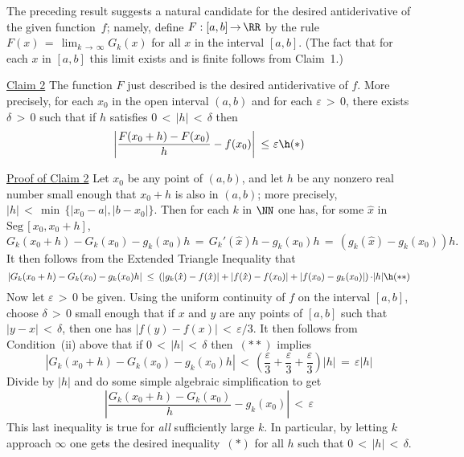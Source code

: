         The preceding result suggests a natural candidate for the desired antiderivative of the given function~$f$; namely,
    define $F:[a,b] \,{\rightarrow}\, {\RR}$ by the rule $F(x) \,=\, \lim_{k \,{\rightarrow}\, {\infty}} G_{k}(x)$ for all $x$ in the interval $[a,b]$.
    (The fact that for each $x$ in $[a,b]$ this limit exists and is finite follows from Claim~1.)

\V

    \underline{Claim 2} The function $F$ just described is the desired antiderivative of $f$.
    More precisely, for each $x_{0}$ in the open interval $(a,b)$ and for each ${\varepsilon}\,>\,0$,
    there exists ${\delta}\,>\,0$ such that if $h$ satisfies $0\,<\,|h|\,<\,{\delta}$ then
        \begin{displaymath}
        \left|\frac{F(x_{0} + h) - F(x_{0})}{h} - f(x_{0})\right|\,\,{\leq}\,\,{\varepsilon} \h ({\ast})
        \end{displaymath}

\V

        \underline{Proof of Claim 2} Let $x_{0}$ be any point of $(a,b)$, and let $h$ be any nonzero real number small enough that $x_{0}+h$ is also in $(a,b)$; more precisely, $|h|\,<\,{\min}\,\{|x_{0}-a|,|b-x_{0}|\}$.
    Then for each $k$ in ${\NN}$ one has, for some $\hat{x}$ in $\mbox{Seg}\,[x_{0}, x_{0}+h]$,
        \begin{displaymath}
        G_{k}(x_{0}+h) - G_{k}(x_{0}) - g_{k}(x_{0})h \,=\, G_{k}'(\hat{x})h - g_{k}(x_{0})h \,=\, (g_{k}(\hat{x}) - g_{k}(x_{0}))h.
        \end{displaymath}
    It then follows from the Extended Triangle Inequality that
        \begin{displaymath}
        \left|G_{k}(x_{0}+h) - G_{k}(x_{0}) - g_{k}(x_{0})h\right| 
    \,\,{\leq}\,\,\left(\left|g_{k}(\hat{x}) - f(\hat{x})\right| +|f(\hat{x}) - f(x_{0})| + \left|f(x_{0}) - g_{k}(x_{0})\right|\right){\cdot}|h| \h ({\ast}{\ast})
        \end{displaymath}
    Now let ${\varepsilon}\,>\,0$ be given. Using the uniform continuity of $f$ on the interval $[a,b]$, choose ${\delta}\,>\,0$ small enough that if $x$ and $y$ are any points of $[a,b]$ such that 
    $|y-x|\,<\,{\delta}$, then one has $|f(y)-f(x)|\,<\,{\varepsilon}/3$.
    It then follows from Condition~(ii) above that if $0\,<\,|h|\,<\,{\delta}$ then~$({\ast}{\ast})$ implies
        \begin{displaymath}
        \left|G_{k}(x_{0}+h) - G_{k}(x_{0}) - g_{k}(x_{0})h\right| \,<\,\left(\frac{{\varepsilon}}{3} + \frac{{\varepsilon}}{3} + \frac{{\varepsilon}}{3}\right)|h| \,=\, {\varepsilon}|h|
        \end{displaymath}
    Divide by $|h|$ and do some simple algebraic simplification to get
        \begin{displaymath}
        \left|\frac{G_{k}(x_{0}+h) - G_{k}(x_{0})}{h} - g_{k}(x_{0})\right|\,<\,{\varepsilon}
        \end{displaymath}
    This last inequality is true for {\em all} sufficiently large $k$. In particular,
    by letting $k$ approach ${\infty}$ one gets the desired inequality~$({\ast})$ for all $h$ such that $0\,<\,|h|\,<\,{\delta}$.

